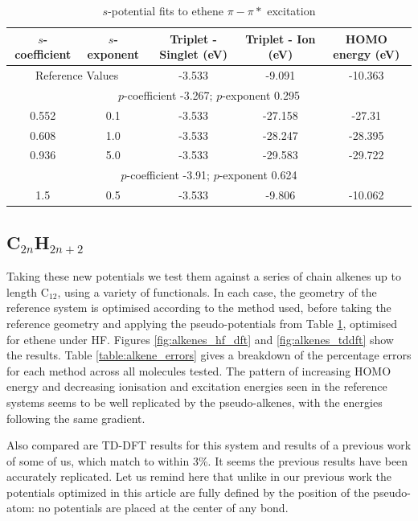 \documentclass[journal=jctcce,manuscript=article]{achemso}
\begin{document}
\begin{table}[ht]
\caption{\(s\)-potential fits to ethene \(\pi-\pi*\) excitation}
\begin{tabular}{c c c c c}
\hline
\(s\)-coefficient & \(s\)-exponent & Triplet - Singlet (eV) & Triplet - Ion (eV) & HOMO energy (eV) \\
\hline
\multicolumn{2}{c}{Reference Values} & -3.533 & -9.091 & -10.363 \\
\hline
\multicolumn{5}{c}{\(p\)-coefficient -3.267; \(p\)-exponent 0.295} \\
\hline
0.552 & 0.1 & -3.533 & -27.158 & -27.31 \\
0.608 & 1.0 & -3.533 & -28.247 & -28.395 \\
0.936 & 5.0 & -3.533 & -29.583 & -29.722 \\
\hline
\multicolumn{5}{c}{\(p\)-coefficient -3.91; \(p\)-exponent 0.624} \\
\hline
1.5 & 0.5 & -3.533 & -9.806 & -10.062 \\
\hline
\end{tabular}
\label{table:ethene_excitations}
\end{table}

\subsection{C\(_{2n}\)H\(_{2n+2}\)}

Taking these new potentials we test them against a series of chain alkenes up to length C\(_{12}\), using a variety of functionals. In each case, the geometry of the reference system is optimised according to the method used, before taking the reference geometry and applying the pseudo-potentials from Table \ref{table:ethene_excitations}, optimised for ethene under HF. Figures \ref{fig:alkenes_hf_dft} and \ref{fig:alkenes_tddft} show the results. Table \ref{table:alkene_errors} gives a breakdown of the percentage errors for each method across all molecules tested. The pattern of increasing HOMO energy and decreasing ionisation and excitation energies seen in the reference systems seems to be well replicated by the pseudo-alkenes, with the energies following the same gradient.

Also compared are TD-DFT results for this system and results of a previous work of some of us, which match to within 3\%.
It seems the previous results have been accurately replicated.\cite{drujon_pseudopotentials_2013}
Let us remind here that unlike in our previous work
the potentials optimized in this article are fully defined by the position
of the pseudo-atom: no potentials are placed at the center of any bond.
\end{document}
